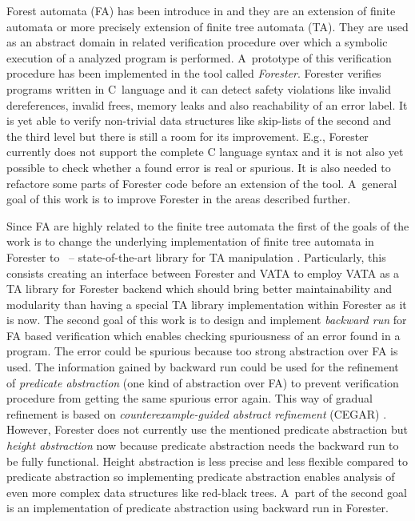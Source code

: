 \documentclass[fleqn,11pt]{ExcelAtFIT} %
\begin{document}
Forest automata (FA) has been introduce in \cite{forester11,forester12} and they are an extension of finite automata or more precisely extension of finite tree automata (TA).
They are used as an abstract domain in related verification procedure over which a symbolic execution of a analyzed program is performed.
A~prototype of this verification procedure has been implemented in the tool called \emph{Forester}.
Forester verifies programs written in C~language and it can detect safety violations like invalid dereferences, invalid frees, memory leaks and also reachability of an error label.
It is yet able to verify non-trivial data structures like skip-lists of the second and the third level
but there is still a room for its improvement.
E.g., Forester currently does not support the complete C language syntax and %
it is not also yet possible to check whether a found error is real or spurious.
It is also needed to refactore some parts of Forester code before an extension of the tool.
A~general goal of this work is to improve Forester in the areas described further.

Since FA are highly related to the finite tree automata the first of the goals of the work is to change
the underlying implementation of finite tree automata in Forester to \vata\ -- state-of-the-art library for TA manipulation \cite{libvata}.
Particularly, this consists creating an interface between Forester and VATA to employ VATA as a TA library for Forester backend
which should bring better maintainability and modularity than having a special TA library implementation within Forester as it is now.
The second goal of this work is to design and implement \emph{backward run} for FA based verification
which enables checking spuriousness of an error found in a program.
The error could be spurious because too strong abstraction over FA is used.
The information gained by backward run could be used for the refinement of \emph{predicate abstraction} (one kind of abstraction over FA)
to prevent verification procedure from getting the same spurious error again.
This way of gradual refinement is based on \emph{counterexample-guided abstract refinement} (CEGAR) \cite{cegar}.
However, Forester does not currently use the mentioned predicate abstraction but \emph{height abstraction} now %
because predicate abstraction needs the backward run to be fully functional.
Height abstraction is less precise and less flexible compared to predicate abstraction so implementing predicate abstraction
enables analysis of even more complex data structures like red-black trees.
A~part of the second goal is an implementation of predicate abstraction using backward run in Forester.
\end{document}
